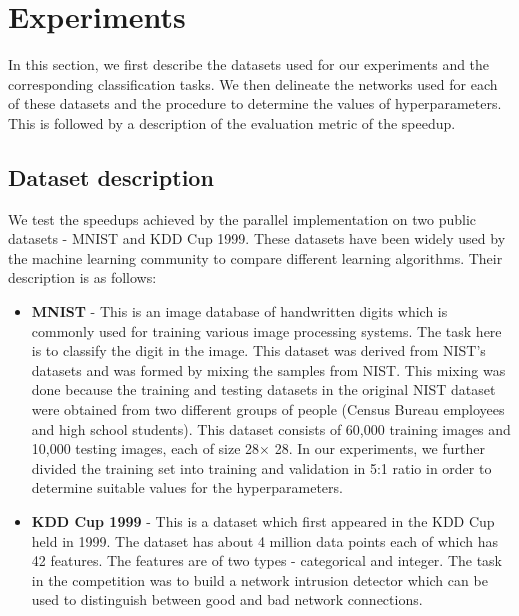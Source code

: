 \section{Experiments}
\label{Exp}
In this section, we first describe the datasets used for our experiments and the corresponding classification tasks. We then delineate the networks used for each of these datasets and the procedure to determine the values of hyperparameters. This is followed by a description of the evaluation metric of the speedup. 

\subsection{Dataset description}
We test the speedups achieved by the parallel implementation on two public datasets - MNIST and KDD Cup 1999. These datasets have been widely used by the machine learning community to compare different learning algorithms. Their description is as follows:

\begin{itemize}
\item \textbf{MNIST} - This is an image database of handwritten digits which is commonly used for training various image processing systems. The task here is to classify the digit in the image. This dataset was derived from NIST's datasets and was formed by mixing the samples from NIST. This mixing was done because the training and testing datasets in the original NIST dataset were obtained from two different groups of people (Census Bureau employees and high school students). This dataset consists of 60,000 training images and 10,000 testing images, each of size 28$\times$ 28. In our experiments, we further divided the training set into training and validation in 5:1 ratio in order to determine suitable values for the hyperparameters.

\item \textbf{KDD Cup 1999} -  This is a dataset which first appeared in the KDD Cup held in 1999. The dataset has about 4 million data points each of which has 42 features. The features are of two types - categorical and integer. The task in the competition was to build a network intrusion detector which can be used to distinguish between good and bad network connections. 
\end{itemize}

